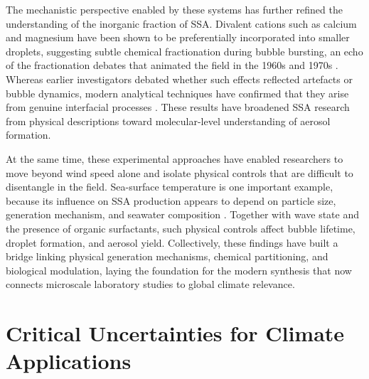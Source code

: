 \documentclass[ProofPDF]{./Styles/Jnls-Template-V3}
\begin{document}
The mechanistic perspective enabled by these systems has further refined the understanding of the inorganic fraction of SSA. Divalent cations such as calcium and magnesium have been shown to be preferentially incorporated into smaller droplets, suggesting subtle chemical fractionation during bubble bursting, an echo of the fractionation debates that animated the field in the 1960s and 1970s \citep{Salter2016,Jayarathne2016}. Whereas earlier investigators debated whether such effects reflected artefacts or bubble dynamics, modern analytical techniques have confirmed that they arise from genuine interfacial processes \citep{Schill2018,Carter2021}. These results have broadened SSA research from physical descriptions toward molecular-level understanding of aerosol formation.

At the same time, these experimental approaches have enabled researchers to move beyond wind speed alone and isolate physical controls that are difficult to disentangle in the field. Sea-surface temperature is one important example, because its influence on SSA production appears to depend on particle size, generation mechanism, and seawater composition \citep{Salter2014,Salter2015,Forestieri2018}. Together with wave state and the presence of organic surfactants, such physical controls affect bubble lifetime, droplet formation, and aerosol yield. Collectively, these findings have built a bridge linking physical generation mechanisms, chemical partitioning, and biological modulation, laying the foundation for the modern synthesis that now connects microscale laboratory studies to global climate relevance.

\section{Critical Uncertainties for Climate Applications}
\end{document}
